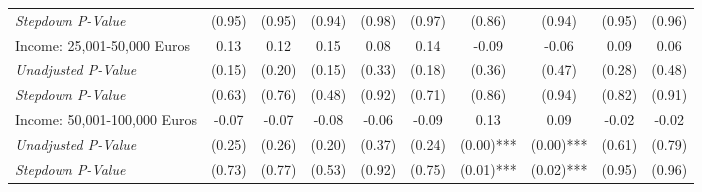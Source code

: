 \begin{tabular}{l c c c c c c c c c}
\quad \textit{Stepdown P-Value} & (0.95) & (0.95) & (0.94) & (0.98) & (0.97) & (0.86) & (0.94) & (0.95) & (0.96) \\
Income: 25,001-50,000 Euros & 0.13 & 0.12 & 0.15 & 0.08 & 0.14 & -0.09 & -0.06 & 0.09 & 0.06 \\
\quad \textit{Unadjusted P-Value} & (0.15) & (0.20) & (0.15) & (0.33) & (0.18) & (0.36) & (0.47) & (0.28) & (0.48) \\
\quad \textit{Stepdown P-Value} & (0.63) & (0.76) & (0.48) & (0.92) & (0.71) & (0.86) & (0.94) & (0.82) & (0.91) \\
Income: 50,001-100,000 Euros & -0.07 & -0.07 & -0.08 & -0.06 & -0.09 & 0.13 & 0.09 & -0.02 & -0.02 \\
\quad \textit{Unadjusted P-Value} & (0.25) & (0.26) & (0.20) & (0.37) & (0.24) & (0.00)*** & (0.00)*** & (0.61) & (0.79) \\
\quad \textit{Stepdown P-Value} & (0.73) & (0.77) & (0.53) & (0.92) & (0.75) & (0.01)*** & (0.02)*** & (0.95) & (0.96) \\
\bottomrule
\end{tabular}
